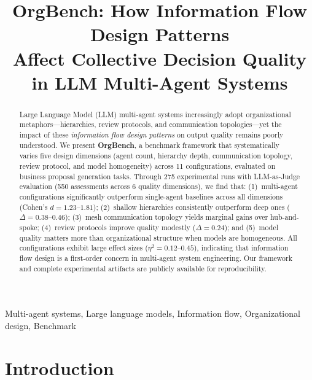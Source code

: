 \documentclass[conference]{IEEEtran}
\begin{document}
\title{OrgBench: How Information Flow Design Patterns\\Affect Collective Decision Quality\\in LLM Multi-Agent Systems}

\author{
\IEEEauthorblockA{
}
}

\maketitle

\begin{abstract}
Large Language Model (LLM) multi-agent systems increasingly adopt organizational metaphors---hierarchies, review protocols, and communication topologies---yet the impact of these \emph{information flow design patterns} on output quality remains poorly understood.
We present \textbf{OrgBench}, a benchmark framework that systematically varies five design dimensions (agent count, hierarchy depth, communication topology, review protocol, and model homogeneity) across 11 configurations, evaluated on business proposal generation tasks.
Through 275 experimental runs with LLM-as-Judge evaluation (550 assessments across 6 quality dimensions), we find that:
(1)~multi-agent configurations significantly outperform single-agent baselines across all dimensions (Cohen's $d = 1.23$--$1.81$);
(2)~shallow hierarchies consistently outperform deep ones ($\Delta = 0.38$--$0.46$);
(3)~mesh communication topology yields marginal gains over hub-and-spoke;
(4)~review protocols improve quality modestly ($\Delta = 0.24$);
and (5)~model quality matters more than organizational structure when models are homogeneous.
All configurations exhibit large effect sizes ($\eta^2 = 0.12$--$0.45$), indicating that information flow design is a first-order concern in multi-agent system engineering.
Our framework and complete experimental artifacts are publicly available for reproducibility.
\end{abstract}

\begin{IEEEkeywords}
Multi-agent systems, Large language models, Information flow, Organizational design, Benchmark
\end{IEEEkeywords}

\section{Introduction}
\label{sec:intro}
\end{document}
